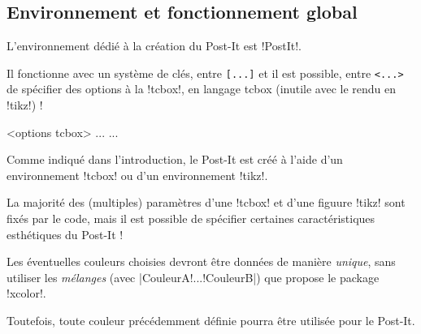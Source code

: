 \documentclass[french,a4paper,11pt]{article}
\begin{document}
\subsection{Environnement et fonctionnement global}

\begin{cautionblock}
L'environnement dédié à la création du Post-It est \packagetex!PostIt!.

Il fonctionne avec un système de clés, entre \texttt{[...]} et il est possible, entre \texttt{<...>} de spécifier des options à la \motcletex!tcbox!, en langage \textsf{tcbox} (inutile avec le rendu en \motcletex!tikz!) !
\end{cautionblock}

\begin{DemoCode}
\begin{PostIt}[clés]<options tcbox>
...
...
\end{PostIt}
\end{DemoCode}

\begin{noteblock}
Comme indiqué dans l'introduction, le Post-It est créé à l'aide d'un environnement \motcletex!tcbox! ou d'un environnement \motcletex!tikz!.

La majorité des (multiples) paramètres d'une \motcletex!tcbox! et d'une figuure \motcletex!tikz! sont fixés par le code, mais il est possible de spécifier certaines caractéristiques esthétiques du Post-It !
\end{noteblock}

\begin{DemoCode}[]
\begin{PostIt}
\lipsum[1][1-2]
\end{PostIt}
\end{DemoCode}

\begin{DemoCode}[]
\begin{PostIt}[Rendu=tikz]
	\lipsum[1][1-2]
\end{PostIt}
\begin{PostIt}[Rendu=tikzv2]
	\lipsum[1][1-2]
\end{PostIt}
\end{DemoCode}

\begin{tipblock}
Les éventuelles couleurs choisies devront être données de manière \textit{unique}, sans utiliser les \textit{mélanges} (avec \motcletex|CouleurA!...!CouleurB|) que propose le package \packagetex!xcolor!. 

Toutefois, toute couleur précédemment définie pourra être utilisée pour le Post-It.
\end{tipblock}
\end{document}
